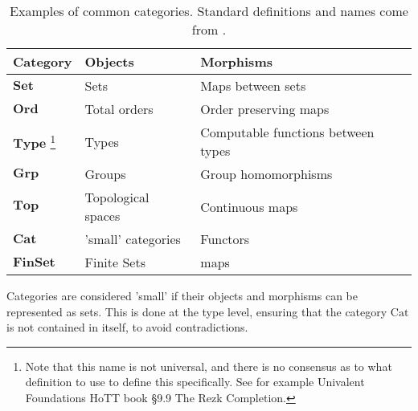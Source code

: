 \begin{table}
	\begin{tabular}{|l|l|l|}
		\hline
		\textbf{Category} & \textbf{Objects} & \textbf{Morphisms} \\
			\hline
			$\mathbf{Set}$                                                                                                                                       & Sets               & Maps between sets                 \\
			\hline
			$\mathbf{Ord}$                                                                                                                                       & Total orders       & Order preserving maps             \\
			\hline
			$\mathbf{Type}$ \footnote{Note that this name is not universal, and there is no consensus as to what definition to use to define this specifically. See for example Univalent Foundations HoTT book §9.9 The Rezk Completion.} & Types              & Computable functions between types\\
			\hline
			$\mathbf{Grp}$                                                                                                                                       & Groups             & Group homomorphisms               \\
			\hline
			$\mathbf{Top}$                                                                                                                                       & Topological spaces & Continuous maps                   \\
			\hline
			$\mathbf{Cat}$                                                                                                                                       & 'small' categories & Functors                          \\
			\hline
			$\mathbf{FinSet}$                                                                                                                                    & Finite Sets        & maps                              \\
			\hline
	\end{tabular}
	\caption{Examples of common categories. Standard definitions and names come from \cite{maclane1998-categories-book,awodey2010-category-theory-book,leinster2014-basic-category-theory}.}
\end{table}
\begin{note}
	Categories are considered 'small' if their objects and morphisms can be
	represented as sets. This is done at the type level, ensuring that the
	category $\mathrm{Cat}$ is not contained in itself, to avoid
	contradictions.
\end{note}
